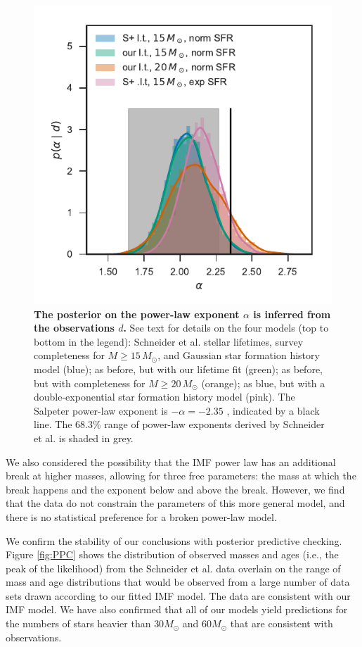 \documentclass[12pt]{article}
\newcommand{\MSun}{M_\odot}
\begin{document}
\begin{figure}
\includegraphics[width=\columnwidth]{alpha.pdf}
    		\caption{{\bf The posterior on the power-law exponent $\alpha$ is inferred from the observations $d$.}  See text for details on the four models (top to bottom in the legend): Schneider et al.\cite{Schneider:2018} stellar lifetimes, survey completeness for $M \geq 15 \, \MSun$, and Gaussian star formation history model (blue); as before, but with our lifetime fit (green); as before, but with completeness for $M \geq 20 \, \MSun$ (orange); as blue, but with a double-exponential star formation history model (pink).  The Salpeter power-law exponent is $-\alpha=-2.35$ \cite{Salpeter:1955}, indicated by a black line.  The 68.3\% range of power-law exponents derived by Schneider et al.\cite{Schneider:2018} is shaded in grey. }\label{fig:IMF}
\end{figure}

We also considered the possibility that the IMF power law has an additional break at higher masses, allowing for three free parameters: the mass at which the break happens and the exponent below and above the break.  However, we find that the data do not constrain the parameters of this more general model, and there is no statistical preference for a broken power-law model.

We confirm the stability of our conclusions with posterior predictive checking.
Figure \ref{fig:PPC} shows the distribution of observed masses and ages (i.e.,
the peak of the likelihood) from the Schneider et al.\cite{Schneider:2018} data overlain on the
range of mass and age distributions that would be observed from a large number
of data sets drawn according to our fitted IMF model.  The data are  consistent with our IMF model.  We have also confirmed that all of our models yield predictions for the numbers of stars heavier than $30 M_\odot$ and $60 M_\odot$ that are consistent with observations.
\end{document}
